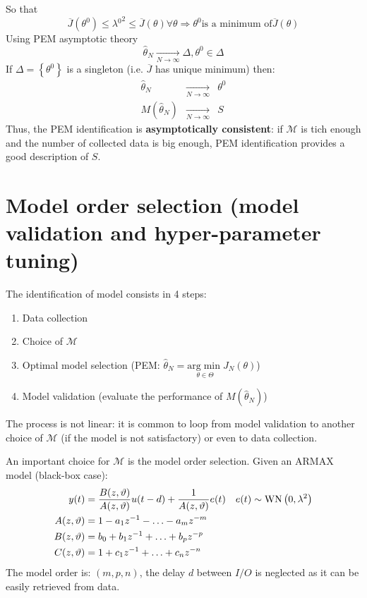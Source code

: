 So that
\begin{equation*}
\overline{J}\left(\theta ^{0}\right) \leq \lambda {^{0}}^{2} \leq \overline{J}(\theta) \forall \theta \Longrightarrow \theta ^{0} \text{is a minimum of} \overline{J}(\theta)
\end{equation*}
Using PEM asymptotic theory
\begin{equation*}
\hat{\theta }_{N}\xrightarrow[N\rightarrow \infty ]{} \Delta ,\theta ^{0} \in \Delta 
\end{equation*}
If $ \Delta =\left\{\theta ^{0}\right\}$ is a singleton (i.e. $ \overline{J}$ has unique minimum) then:
\begin{equation*}
\begin{aligned}
\hat{\theta }_{N} & \xrightarrow[N\rightarrow \infty ]{} & \theta ^{0}\\
M(\hat{\theta }_{N}) & \xrightarrow[N\rightarrow \infty ]{} & S
\end{aligned}
\end{equation*}
Thus, the PEM identification is \textbf{asymptotically consistent}: if $ \mathcal{M}$ is tich enough and the number of collected data is big enough, PEM identification provides a good description of $ S$.



\section{Model order selection (model validation and hyper-parameter tuning)}

The identification of model consists in 4 steps:
\begin{enumerate}
\item Data collection
\item Choice of $ \mathcal{M}$
\item Optimal model selection (PEM: $ \hat{\theta }_{N} =\underset{\theta \in \Theta }{\mathrm{arg}\min} J_{N}(\theta)$)
\item Model validation (evaluate the performance of $ M(\hat{\theta }_{N})$)
\end{enumerate}

The process is not linear: it is common to loop from model validation to another choice of $ \mathcal{M}$ (if the model is not satisfactory) or even to data collection.

An important choice for $ \mathcal{M}$ is the model order selection. Given an ARMAX model (black-box case):
\begin{gather*}
\begin{aligned}
y(t)  & =\frac{B(z,\vartheta)}{A(z,\vartheta)} u(t-d) +\frac{1}{A(z,\vartheta)} e(t) & e(t) \sim \operatorname{WN} \left(0,\lambda ^{2}\right)\\
A(z,\vartheta)  & =1-a_{1} z^{-1} -\dotsc -a_{m} z^{-m} & \\
B(z,\vartheta) & =b_{0} +b_{1} z^{-1} +\dotsc +b_{p} z^{-p} & \\
C(z,\vartheta) & =1+c_{1} z^{-1} +\dotsc +c_{n} z^{-n} & 
\end{aligned}\\
\end{gather*}
The model order is: $ (m,p,n)$, the delay $ d$ between $ I/O$ is neglected as it can be easily retrieved from data.

